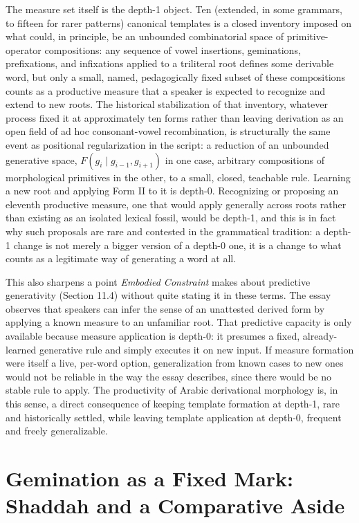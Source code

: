 \documentclass[11pt]{article}
\begin{document}
The measure set itself is the depth-1 object. Ten (extended, in some
grammars, to fifteen for rarer patterns) canonical templates is a closed
inventory imposed on what could, in principle, be an unbounded combinatorial
space of primitive-operator compositions: any sequence of vowel insertions,
geminations, prefixations, and infixations applied to a triliteral root
defines some derivable word, but only a small, named, pedagogically fixed
subset of these compositions counts as a productive measure that a speaker
is expected to recognize and extend to new roots. The historical
stabilization of that inventory, whatever process fixed it at approximately
ten forms rather than leaving derivation as an open field of ad hoc
consonant-vowel recombination, is structurally the same event as positional
regularization in the script: a reduction of an unbounded generative space,
$F(g_i \mid g_{i-1}, g_{i+1})$ in one case, arbitrary compositions of
morphological primitives in the other, to a small, closed, teachable rule.
Learning a new root and applying Form II to it is depth-0. Recognizing or
proposing an eleventh productive measure, one that would apply generally
across roots rather than existing as an isolated lexical fossil, would be
depth-1, and this is in fact why such proposals are rare and contested in
the grammatical tradition: a depth-1 change is not merely a bigger version
of a depth-0 one, it is a change to what counts as a legitimate way of
generating a word at all.

This also sharpens a point \emph{Embodied Constraint} makes about
predictive generativity (Section 11.4) without quite stating it in these
terms. The essay observes that speakers can infer the sense of an unattested
derived form by applying a known measure to an unfamiliar root. That
predictive capacity is only available because measure application is
depth-0: it presumes a fixed, already-learned generative rule and simply
executes it on new input. If measure formation were itself a live, per-word
option, generalization from known cases to new ones would not be reliable
in the way the essay describes, since there would be no stable rule to
apply. The productivity of Arabic derivational morphology is, in this
sense, a direct consequence of keeping template formation at depth-1, rare
and historically settled, while leaving template application at depth-0,
frequent and freely generalizable.

\section{Gemination as a Fixed Mark: Shaddah and a Comparative Aside}
\end{document}
